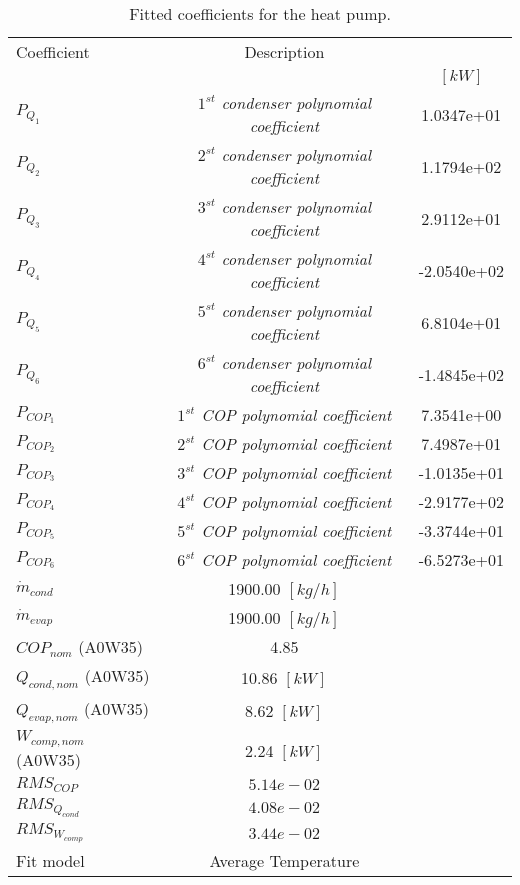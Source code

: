 \documentclass[english]{SPFShortReport}
\author{Dani Carbonell}
\begin{document}
\begin{table}[!ht]
\begin{small}
\caption{Fitted coefficients for the heat pump.}
\begin{center}
\resizebox{12cm}{!} 
{
\begin{tabular}{l | c c } 
\hline
\hline
Coefficient &Description & \\ 
 & &$[kW]$\\ 
\hline
$P_{Q_{1}}$ & \emph{$1^{st}$ condenser polynomial coefficient}  & 1.0347e+01    \\ 
$P_{Q_{2}}$ & \emph{$2^{st}$ condenser polynomial coefficient}  & 1.1794e+02    \\ 
$P_{Q_{3}}$ & \emph{$3^{st}$ condenser polynomial coefficient}  & 2.9112e+01    \\ 
$P_{Q_{4}}$ & \emph{$4^{st}$ condenser polynomial coefficient}  & -2.0540e+02    \\ 
$P_{Q_{5}}$ & \emph{$5^{st}$ condenser polynomial coefficient}  & 6.8104e+01    \\ 
$P_{Q_{6}}$ & \emph{$6^{st}$ condenser polynomial coefficient}  & -1.4845e+02    \\ 
\hline
$P_{COP_{1}}$ & \emph{$1^{st}$ COP polynomial coefficient}  & 7.3541e+00    \\ 
$P_{COP_{2}}$ & \emph{$2^{st}$ COP polynomial coefficient}  & 7.4987e+01    \\ 
$P_{COP_{3}}$ & \emph{$3^{st}$ COP polynomial coefficient}  & -1.0135e+01    \\ 
$P_{COP_{4}}$ & \emph{$4^{st}$ COP polynomial coefficient}  & -2.9177e+02    \\ 
$P_{COP_{5}}$ & \emph{$5^{st}$ COP polynomial coefficient}  & -3.3744e+01    \\ 
$P_{COP_{6}}$ & \emph{$6^{st}$ COP polynomial coefficient}  & -6.5273e+01    \\ 
\hline
$\dot m_{cond}$ & 1900.00 $[kg/h]$ \\ 
$\dot m_{evap}$ & 1900.00 $[kg/h]$ \\ 
\hline
$COP_{nom}$ (A0W35)& 4.85 \\ 
$Q_{cond,nom}$ (A0W35)& 10.86 $[kW]$\\ 
$Q_{evap,nom}$ (A0W35)& 8.62 $[kW]$\\ 
$W_{comp,nom}$ (A0W35)& 2.24 $[kW]$\\ 
\hline
 $RMS_{COP}$ & $5.14e-02$ \\ 
 $RMS_{Q_{cond}}$ & $4.08e-02$ \\ 
 $RMS_{W_{comp}}$ & $3.44e-02$ \\ 
\hline
Fit model & Average Temperature\\ 
\hline
\hline
\end{tabular}
}
\label{CoefTable}
\end{center}
\end{small}
\end{table}
\end{document}
